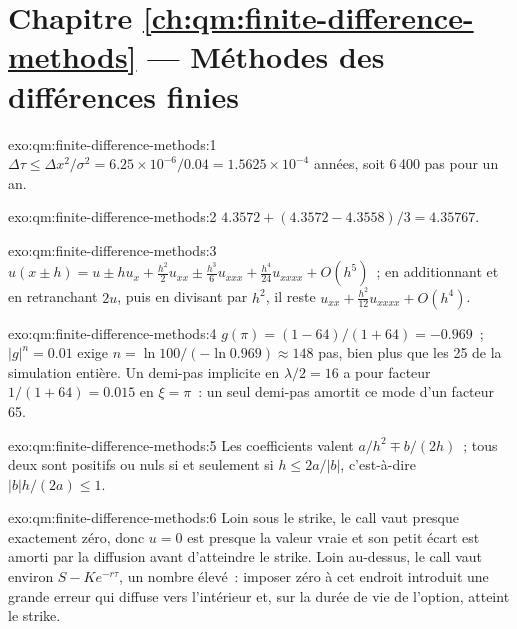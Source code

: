 \section*{Chapitre \ref{ch:qm:finite-difference-methods} --- Méthodes des différences finies}

\begin{solution}{exo:qm:finite-difference-methods:1}
$\Delta\tau \le \Delta x^2/\sigma^2 = 6.25 \times 10^{-6}/0.04 = 1.5625 \times 10^{-4}$ années, soit 6\,400 pas pour un an.
\end{solution}

\begin{solution}{exo:qm:finite-difference-methods:2}
$4.3572 + (4.3572 - 4.3558)/3 = 4.35767$.
\end{solution}

\begin{solution}{exo:qm:finite-difference-methods:3}
$u(x \pm h) = u \pm hu_x + \frac{h^2}{2}u_{xx} \pm \frac{h^3}{6}u_{xxx} + \frac{h^4}{24}u_{xxxx} + O(h^5)$~; en additionnant et en retranchant $2u$, puis en divisant par $h^2$, il reste $u_{xx} + \frac{h^2}{12}u_{xxxx} + O(h^4)$.
\end{solution}

\begin{solution}{exo:qm:finite-difference-methods:4}
$g(\pi) = (1 - 64)/(1 + 64) = -0.969$~; $|g|^n = 0.01$ exige $n = \ln100/(-\ln0.969) \approx 148$ pas, bien plus que les 25 de la simulation entière. Un demi-pas implicite en $\lambda/2 = 16$ a pour facteur $1/(1 + 64) =
0.015$ en $\xi = \pi$~: un seul demi-pas amortit ce mode d'un facteur 65.
\end{solution}

\begin{solution}{exo:qm:finite-difference-methods:5}
Les coefficients valent $a/h^2 \mp b/(2h)$~; tous deux sont positifs ou nuls si et seulement si $h \le 2a/|b|$, c'est-à-dire $|b|h/(2a) \le 1$.
\end{solution}

\begin{solution}{exo:qm:finite-difference-methods:6}
Loin sous le strike, le call vaut presque exactement zéro, donc $u = 0$ est presque la valeur vraie et son petit écart est amorti par la diffusion avant d'atteindre le strike. Loin au-dessus, le call vaut
environ $S - Ke^{-r\tau}$, un nombre élevé~: imposer zéro à cet endroit introduit une grande erreur qui diffuse vers l'intérieur et, sur la durée de vie de l'option, atteint le strike.
\end{solution}

